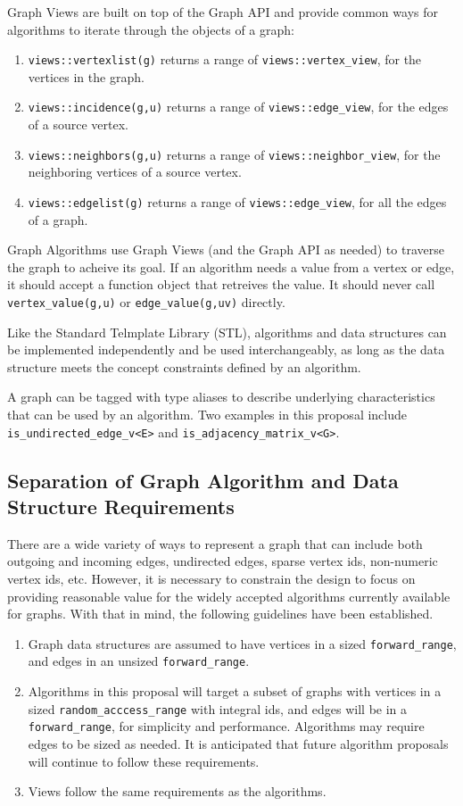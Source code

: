 \documentclass[10pt,onecolumn]{article}
\newcommand{\tcode}[1]{\lstinline[breaklines=true]{#1}}
\begin{document}
Graph Views are built on top of the Graph API and provide common ways for algorithms to iterate through the objects of a graph:
\begin{enumerate}
\item \tcode{views::vertexlist(g)} returns a range of \tcode{views::vertex_view}, for the vertices in the graph. 
\item \tcode{views::incidence(g,u)} returns a range of \tcode{views::edge_view}, for the edges of a source vertex.
\item \tcode{views::neighbors(g,u)} returns a range of \tcode{views::neighbor_view}, for the neighboring vertices of a source vertex.
\item \tcode{views::edgelist(g)} returns a range of \tcode{views::edge_view}, for all the edges of a graph. 
\end{enumerate}

Graph Algorithms use Graph Views (and the Graph API as needed) to traverse the graph to acheive its goal. If an algorithm needs a value from 
a vertex or edge, it should accept a function object that retreives the value. It should never call \tcode{vertex_value(g,u)} or \tcode{edge_value(g,uv)}
directly.

Like the Standard Telmplate Library (STL), algorithms and data structures can be implemented independently and be used interchangeably,
as long as the data structure meets the concept constraints defined by an algorithm.

A graph can be tagged with type aliases to describe underlying characteristics that can be used by an algorithm. Two examples
in this proposal include \tcode{is_undirected_edge_v<E>} and \tcode{is_adjacency_matrix_v<G>}.

\subsection{Separation of Graph Algorithm and Data Structure Requirements}

There are a wide variety of ways to represent a graph that can include both outgoing and incoming edges, undirected edges,
sparse vertex ids, non-numeric vertex ids, etc. However, it is necessary to constrain the design to focus on providing reasonable 
value for the widely accepted algorithms currently available for graphs. With that in mind, the following guidelines have been established.
\begin{enumerate}
\item Graph data structures are assumed to have vertices in a sized \tcode{forward_range}, and edges in an unsized \tcode{forward_range}.
\item Algorithms in this proposal will target a subset of graphs with vertices in a sized \tcode{random_acccess_range} with 
integral ids, and edges will be in a \tcode{forward_range}, for simplicity and performance. Algorithms may require edges to be sized as
needed. It is anticipated that future algorithm proposals will continue to follow these requirements.
\item Views follow the same requirements as the algorithms.
\end{enumerate}
\end{document}
